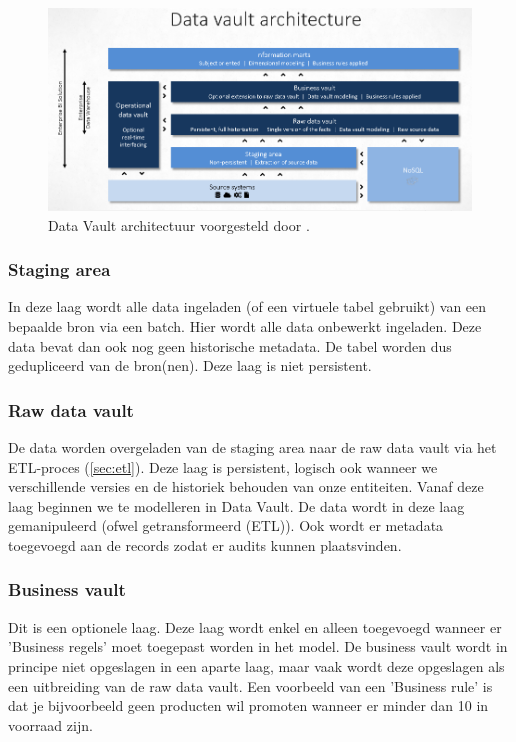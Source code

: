 \begin{figure}[h]
	\includegraphics[scale=0.63]{../images/DVArchitectuur.png}
	\caption{Data Vault architectuur voorgesteld door \textcite{Stroobants2018}.}
	\label{fig:dvarch}
\end{figure}

\subsubsection{Staging area}
In deze laag wordt alle data ingeladen (of een virtuele tabel gebruikt) van een bepaalde bron via een batch. Hier wordt alle data onbewerkt ingeladen. Deze data bevat dan ook nog geen historische metadata. De tabel worden dus gedupliceerd van de bron(nen). Deze laag is niet persistent.

\subsubsection{Raw data vault}
De data worden overgeladen van de staging area naar de raw data vault via het ETL-proces (\ref{sec:etl}). Deze laag is persistent, logisch ook wanneer we verschillende versies en de historiek behouden van onze entiteiten. Vanaf deze laag beginnen we te modelleren in Data Vault. De data wordt in deze laag gemanipuleerd (ofwel getransformeerd (ETL)). Ook wordt er metadata toegevoegd aan de records zodat er audits kunnen plaatsvinden. 

\subsubsection{Business vault}
Dit is een optionele laag. Deze laag wordt enkel en alleen toegevoegd wanneer er 'Business regels' moet toegepast worden in het model. De business vault wordt in principe niet opgeslagen in een aparte laag, maar vaak wordt deze opgeslagen als een uitbreiding van de raw data vault. Een voorbeeld van een 'Business rule' is dat je bijvoorbeeld geen producten wil promoten wanneer er minder dan 10 in voorraad zijn.

